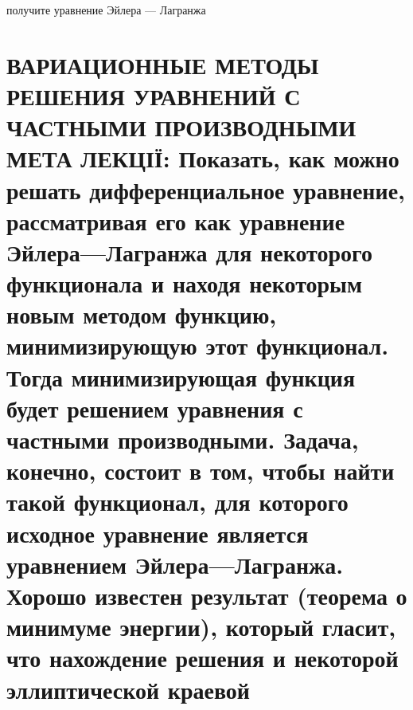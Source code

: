\documentclass[
  ukrainian,
]{article}
\begin{document}
получите уравнение Эйлера --- Лагранжа

\section{ВАРИАЦИОННЫЕ МЕТОДЫ РЕШЕНИЯ УРАВНЕНИЙ С ЧАСТНЫМИ ПРОИЗВОДНЫМИ
МЕТА ЛЕКЦІЇ: Показать, как можно решать дифференциальное уравнение,
рассматривая его как уравнение Эйлера---Лагранжа для некоторого
функционала и находя некоторым новым методом функцию, минимизирующую
этот функционал. Тогда минимизирующая функция будет решением уравнения с
частными производными. Задача, конечно, состоит в том, чтобы найти такой
функционал, для которого исходное уравнение является уравнением
Эйлера---Лагранжа. Хорошо известен результат (теорема о минимуме
энергии), который гласит, что нахождение решения и некоторой
эллиптической краевой
}
\end{document}
